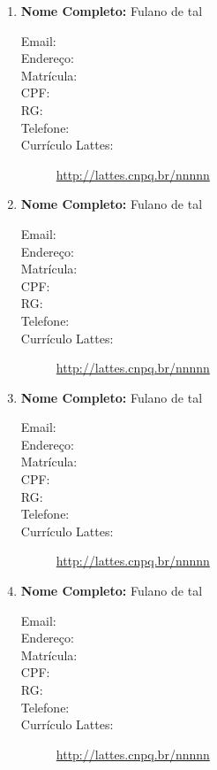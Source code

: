 \documentclass[a4paper,12pt]{article} %
\begin{document}
\begin{enumerate}
    \item \textbf{Nome Completo:} Fulano de tal
    \begin{description}
        \item [Email:] 
        \item [Endereço:]
        \item [Matrícula:]
        \item [CPF:]
        \item [RG:]
        \item [Telefone:]
        \item [Currículo Lattes:] \url{http://lattes.cnpq.br/nnnnn}
    \end{description}

    \item \textbf{Nome Completo:} Fulano de tal
    \begin{description}
        \item [Email:] 
        \item [Endereço:]
        \item [Matrícula:]
        \item [CPF:]
        \item [RG:]
        \item [Telefone:]
        \item [Currículo Lattes:] \url{http://lattes.cnpq.br/nnnnn}
    \end{description}

    \item \textbf{Nome Completo:} Fulano de tal
    \begin{description}
        \item [Email:] 
        \item [Endereço:]
        \item [Matrícula:]
        \item [CPF:]
        \item [RG:]
        \item [Telefone:]
        \item [Currículo Lattes:] \url{http://lattes.cnpq.br/nnnnn}
    \end{description}

    \item \textbf{Nome Completo:} Fulano de tal
    \begin{description}
        \item [Email:] 
        \item [Endereço:]
        \item [Matrícula:]
        \item [CPF:]
        \item [RG:]
        \item [Telefone:]
        \item [Currículo Lattes:] \url{http://lattes.cnpq.br/nnnnn}
    \end{description}


\end{enumerate}
\end{document}
